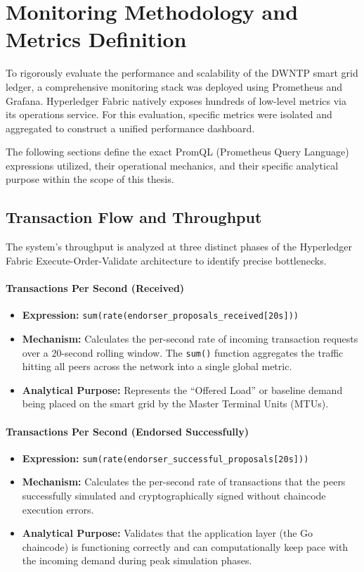 \section{Monitoring Methodology and Metrics Definition}
\label{sec:metrics_definition}

To rigorously evaluate the performance and scalability of the DWNTP smart grid ledger, a comprehensive monitoring stack was deployed using Prometheus and Grafana. Hyperledger Fabric natively exposes hundreds of low-level metrics via its operations service. For this evaluation, specific metrics were isolated and aggregated to construct a unified performance dashboard.

The following sections define the exact PromQL (Prometheus Query Language) expressions utilized, their operational mechanics, and their specific analytical purpose within the scope of this thesis.

\subsection{Transaction Flow and Throughput}

The system's throughput is analyzed at three distinct phases of the Hyperledger Fabric Execute-Order-Validate architecture to identify precise bottlenecks.

\paragraph{Transactions Per Second (Received)}
\begin{itemize}
    \item \textbf{Expression:} \verb|sum(rate(endorser_proposals_received[20s]))|
    \item \textbf{Mechanism:} Calculates the per-second rate of incoming transaction requests over a 20-second rolling window. The \texttt{sum()} function aggregates the traffic hitting all peers across the network into a single global metric.
    \item \textbf{Analytical Purpose:} Represents the ``Offered Load'' or baseline demand being placed on the smart grid by the Master Terminal Units (MTUs).
\end{itemize}

\paragraph{Transactions Per Second (Endorsed Successfully)}
\begin{itemize}
    \item \textbf{Expression:} \verb|sum(rate(endorser_successful_proposals[20s]))|
    \item \textbf{Mechanism:} Calculates the per-second rate of transactions that the peers successfully simulated and cryptographically signed without chaincode execution errors.
    \item \textbf{Analytical Purpose:} Validates that the application layer (the Go chaincode) is functioning correctly and can computationally keep pace with the incoming demand during peak simulation phases.
\end{itemize}

